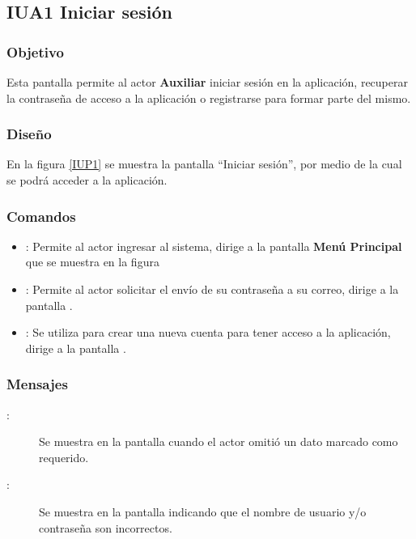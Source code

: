 \subsection{IUA1 Iniciar sesión}
 
\subsubsection{Objetivo}

    Esta pantalla permite al actor \textbf{Auxiliar} iniciar sesión en la aplicación, recuperar la contraseña de acceso a la aplicación o registrarse para formar parte del mismo.

\subsubsection{Diseño}

    En la figura \ref{IUP1} se muestra la pantalla ``Iniciar sesión'', por medio de la cual se podrá acceder a la aplicación. \\


\subsubsection{Comandos}
\begin{itemize}
    \item {}: Permite al actor ingresar al sistema, dirige a la pantalla \textbf{Menú Principal} que se muestra en la figura %
    \item {}: Permite al actor solicitar el envío de su contraseña a su correo, dirige a la pantalla .
    \item {}: Se utiliza para crear una nueva cuenta para tener acceso a la aplicación, dirige a la pantalla .
\end{itemize}

\subsubsection{Mensajes}

\begin{description}
    \item[:] Se muestra en la pantalla  cuando el actor omitió un dato marcado como requerido.
    \item[:] Se muestra en la pantalla  indicando que el nombre de usuario y/o contraseña son incorrectos.
\end{description}
